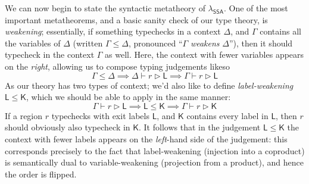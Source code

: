 \documentclass[acmsmall,screen,review]{acmart}
\newcommand{\ms}[1]{\ensuremath{\mathsf{#1}}}
\newcommand{\haslb}[3]{#1 \vdash #2 \rhd #3}
\newcommand{\isotopessa}{\(\lambda_{\ms{SSA}}\)}
\begin{document}
We can now begin to state the syntactic metatheory of \isotopessa{}. One of the most important
metatheorems, and a basic sanity check of our type theory, is \emph{weakening}; essentially, if
something typechecks in a context $\Delta$, and $\Gamma$ contains all the variables of $\Delta$
(written $\Gamma \leq \Delta$, pronounced ``$\Gamma$ \emph{weakens} $\Delta$''), then it should
typecheck in the context $\Gamma$ as well. Here, the context with fewer variables appears on the
\emph{right}, allowing us to compose typing judgements likeso
\begin{equation*}
  \Gamma \leq \Delta \implies \haslb{\Delta}{r}{\ms{L}} \implies \haslb{\Gamma}{r}{\ms{L}}
\end{equation*}
As our theory has two types of context; we'd also like to define \emph{label-weakening} $\ms{L} \leq
\ms{K}$, which we should be able to apply in the same manner:
\begin{equation*}
  \haslb{\Gamma}{r}{\ms{L}} \implies \ms{L} \leq \ms{K} \implies \haslb{\Gamma}{r}{\ms{K}}
\end{equation*}
If a region $r$ typechecks with exit labels $\ms{L}$, and $\ms{K}$ contains every label in $\ms{L}$,
then $r$ should obviously also typecheck in $\ms{K}$. It follows that in the judgement $\ms{L} \leq
\ms{K}$ the context with fewer labels appears on the \emph{left}-hand side of the judgement: this
corresponds precisely to the fact that label-weakening (injection into a coproduct) is semantically
dual to variable-weakening (projection from a product), and hence the order is flipped.
\end{document}
